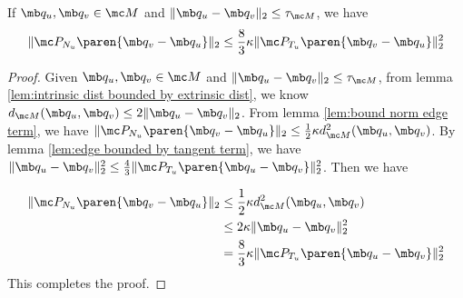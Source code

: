 \begin{lemma} \label{lem:bound normal edge by tangent edge square}
    If $\mb q_u, \mb q_v \in \mc M$ and $\| \mb q_u - \mb q_v \|_2 \leq \tau_{\mc M}$, we have
    \begin{equation}
        \| \mc P_{N_u} \paren{\mb q_v - \mb q_u} \|_2 \leq \frac{8}{3} \kappa \| \mc P_{T_u} \paren{\mb q_v - \mb q_u} \|_2^2
    \end{equation}
\end{lemma}
\begin{proof}
    Given $\mb q_u, \mb q_v \in \mc M$ and $\| \mb q_u - \mb q_v \|_2 \leq \tau_{\mc M}$, from lemma \ref{lem:intrinsic dist bounded by extrinsic dist}, we know $d_{\mc M}(\mb q_u, \mb q_v) \leq 2 \| \mb q_u - \mb q_v \|_2$.
    From lemma \ref{lem:bound norm edge term}, we have
    $\| \mc P_{N_u} \paren{\mb q_v - \mb q_u} \|_2 \leq \frac{1}{2} \kappa d_{\mc M}^2(\mb q_u, \mb q_v)$. By lemma \ref{lem:edge bounded by tangent term}, we have  $ \| \mb q_u - \mb q_v \|_2^2 \leq \frac{4}{3} \| \mc P_{T_u} \paren{\mb q_u - \mb q_v} \|_2^2$. Then we have 

    \begin{equation}
        \begin{aligned}
        \| \mc P_{N_u} \paren{\mb q_v - \mb q_u} \|_2
        &\leq \frac{1}{2} \kappa d_{\mc M}^2(\mb q_u, \mb q_v)\\
        &\leq 2 \kappa \| \mb q_u - \mb q_v \|_2^2\\
        &= \frac{8}{3} \kappa \| \mc P_{T_u} \paren{\mb q_u - \mb q_v} \|_2^2
        \end{aligned}
    \end{equation}
This completes the proof.
\end{proof}

